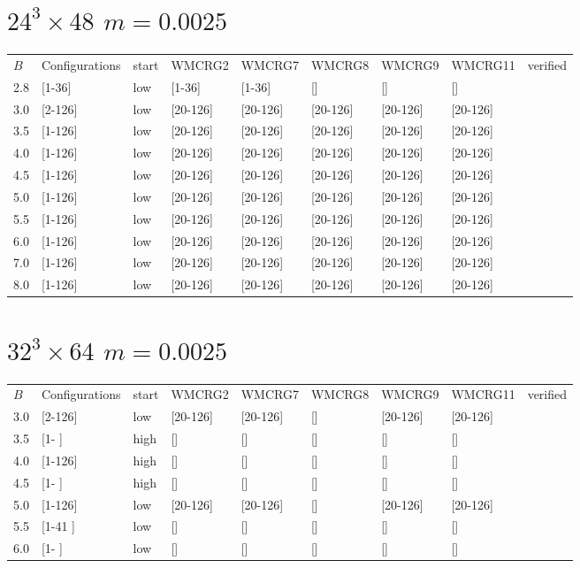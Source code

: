 \documentclass{article}
\begin{document}
  \section{$24^3\times48$  $m=0.0025$}
    \begin{tabular}{ l | l | l | l | l }
      \hline
      $B$ & Configurations & start & WMCRG2 & WMCRG7 & WMCRG8 & WMCRG9 & WMCRG11 & verified\\
      2.8 & [1-36]  & low & [1-36]   & [1-36]   & [] & [] & [] &\\
      3.0 & [2-126] & low & [20-126] & [20-126] & [20-126] & [20-126] & [20-126] &\\
      3.5 & [1-126] & low & [20-126] & [20-126] & [20-126] & [20-126] & [20-126] &\\
      4.0 & [1-126] & low & [20-126] & [20-126] & [20-126] & [20-126] & [20-126] &\\
      4.5 & [1-126] & low & [20-126] & [20-126] & [20-126] & [20-126] & [20-126] &\\
      5.0 & [1-126] & low & [20-126] & [20-126] & [20-126] & [20-126] & [20-126] &\\
      5.5 & [1-126] & low & [20-126] & [20-126] & [20-126] & [20-126] & [20-126] &\\
      6.0 & [1-126] & low & [20-126] & [20-126] & [20-126] & [20-126] & [20-126] &\\
      7.0 & [1-126] & low & [20-126] & [20-126] & [20-126] & [20-126] & [20-126] &\\
      8.0 & [1-126] & low & [20-126] & [20-126] & [20-126] & [20-126] & [20-126] &\\
      \hline
    \end{tabular}
  \section{$32^3\times64$  $m=0.0025$}
    \begin{tabular}{ l | l | l | l | l }
      \hline
      $B$ & Configurations & start & WMCRG2 & WMCRG7 & WMCRG8 & WMCRG9 & WMCRG11 & verified\\
      3.0 & [2-126] & low  & [20-126] & [20-126] & [] & [20-126] & [20-126] &\\
      3.5 & [1-   ] & high & [] & [] & [] & [] & [] &\\
      4.0 & [1-126] & high & [] & [] & [] & [] & [] &\\
      4.5 & [1-   ] & high & [] & [] & [] & [] & [] &\\
      5.0 & [1-126] & low  & [20-126] & [20-126] & [] & [20-126] & [20-126] &\\
      5.5 & [1-41 ] & low  & [] & [] & [] & [] & [] &\\
      6.0 & [1-   ] & low  & [] & [] & [] & [] & [] &\\
      \hline
    \end{tabular}
\end{document}
